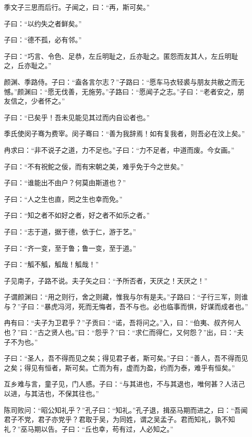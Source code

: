 \documentclass[a5paper]{ctexbook}
\begin{document}
    季文子三思而后行。子闻之，曰：“再，斯可矣。”
    
    子曰：“以约失之者鲜矣。”

    子曰：“德不孤，必有邻。”

    子曰：“巧言、令色、足恭，左丘明耻之，丘亦耻之。匿怨而友其人，左丘明耻之，丘亦耻之。”

    颜渊、季路侍。子曰：“盍各言尔志？”子路曰：“愿车马衣轻裘与朋友共敝之而无憾。”颜渊曰：“愿无伐善，无施劳。”子路曰：“愿闻子之志。”子曰：“老者安之，朋友信之，少者怀之。”

    子曰：“已矣乎！吾未见能见其过而内自讼者也。”

    季氏使闵子骞为费宰。闵子骞曰：“善为我辞焉！如有复我者，则吾必在汶上矣。”

    冉求曰：“非不说子之道，力不足也。”子曰：“力不足者，中道而废。今女画。”

    子曰：“不有祝𬶍之佞，而有宋朝之美，难乎免于今之世矣。”

    子曰：“谁能出不由户？何莫由斯道也？”

    子曰：“人之生也直，罔之生也幸而免。”

    子曰：“知之者不如好之者，好之者不如乐之者。”

    

    子曰：“志于道，据于德，依于仁，游于艺。”

    子曰：“齐一变，至于鲁；鲁一变，至于道。”

    子曰：“觚不觚，觚哉！觚哉！”

    子见南子，子路不说。夫子矢之曰：“予所否者，天厌之！天厌之！”

    子谓颜渊曰：“用之则行，舍之则藏，惟我与尔有是夫。”子路曰：“子行三军，则谁与？”子曰：“暴虎冯河，死而无悔者，吾不与也。必也临事而惧，好谋而成者也。”

    冉有曰：“夫子为卫君乎？”子贡曰：“诺，吾将问之。”入，曰：“伯夷、叔齐何人也？”曰：“古之贤人也。”曰：“怨乎？”曰：“求仁而得仁，又何怨？”出，曰：“夫子不为也。”

    子曰：“圣人，吾不得而见之矣；得见君子者，斯可矣。”子曰：“善人，吾不得而见之矣；得见有恒者，斯可矣。亡而为有，虚而为盈，约而为泰，难乎有恒矣。”

    互乡难与言，童子见，门人惑。子曰：“与其进也，不与其退也，唯何甚？人洁己以进，与其洁也，不保其往也。”

    陈司败问：“昭公知礼乎？”孔子曰：“知礼。”孔子退，揖巫马期而进之，曰：“吾闻君子不党，君子亦党乎？君取于吴，为同姓，谓之吴孟子。君而知礼，孰不知礼？”巫马期以告。子曰：“丘也幸，苟有过，人必知之。”
\end{document}
